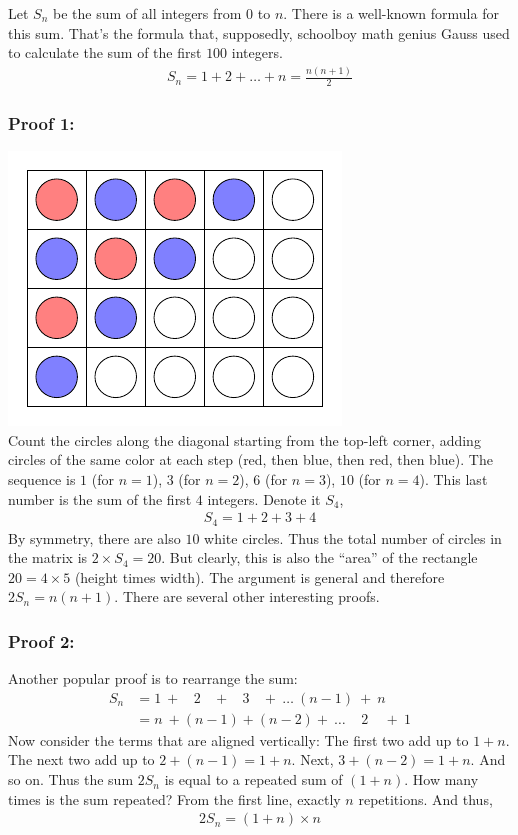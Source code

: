 \documentclass[12pt]{article}
\begin{document}
\begin{answer}
Let $S_{n}$ be the sum of all integers from $0$ to $n$. There is a well-known formula for this sum. That's the formula that, supposedly, schoolboy math genius Gauss used to calculate the sum of the first $100$ integers. 
\begin{align*}
S_{n} = 1 + 2 + \ldots + n
= \frac{n(n+1)}{2}
\end{align*}
\subsubsection*{Proof 1:}
\includegraphics{tikz-matrix-nodes-circles-2}\bigskip\\
Count the circles along the diagonal starting from the top-left corner, adding circles of the same color at each step (red, then blue, then red, then blue). The sequence is $1$ (for $n=1$), $3$ (for $n=2$), $6$ (for $n=3$), $10$ (for $n=4$). This last number is the sum of the first $4$ integers. Denote it $S_{4}$,
\begin{align*}
S_{4} = 1 + 2 + 3 + 4
\end{align*}
By symmetry, there are also $10$ white circles. Thus the total number of circles in the matrix is $2 \times S_{4} = 20$. But clearly, this is also the ``area'' of the rectangle $20=4\times5$ (height times width). The argument is general and therefore $2 S_{n} = n(n+1)$. There are several other interesting proofs. 

\subsubsection*{Proof 2:}
Another popular proof is to rearrange the sum:
\begin{align*}
S_{n} & = 1 ~+~~~~2 ~~~~+~~~~3 ~~~~+~\ldots~ (n-1) ~+~ n \\
      & = n ~+ (n-1) + (n-2) + ~\ldots~~~~~ 2 ~~~~~ + ~ 1
\end{align*}
Now consider the terms that are aligned vertically: The first two add up to $1+n$. The next two add up to $2+(n-1)=1+n$. Next, $3+(n-2)=1+n$. And so on. Thus the sum $2S_{n}$ is equal to a repeated sum of  $(1+n)$. How many times is the sum repeated? From the first line, exactly $n$ repetitions. And thus,
\begin{align*}
2 S_{n} = (1+n) \times n
\end{align*}

\end{answer}
\end{document}
